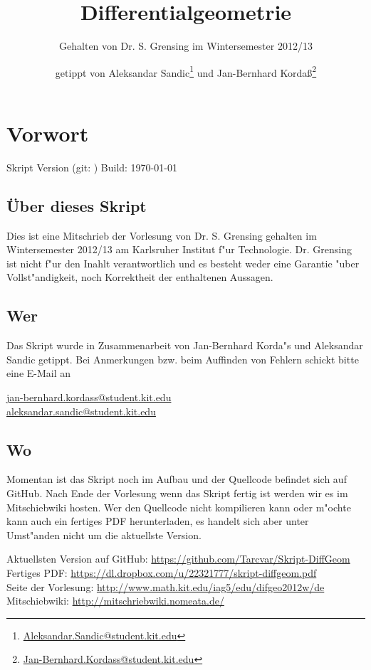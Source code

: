 \documentclass[paper=A4, twoside, chapterprefix=true, bibliography=totoc, headsepline]{scrbook}
\title{Differentialgeometrie}
\subtitle{Gehalten von Dr. S. Grensing im Wintersemester 2012/13}
\author{getippt von Aleksandar Sandic\thanks{\href{mailto:aleksandar.sandic@student.kit.edu}{Aleksandar.Sandic@student.kit.edu}} und Jan-Bernhard Korda\ss\thanks{\href{mailto:jan-bernhard.kordass@student.kit.edu}{Jan-Bernhard.Kordass@student.kit.edu}}}
\begin{document}
\maketitle

\setlength\parskip{0.6pt}
\tableofcontents

\chapter*{Vorwort}
\setlength\parskip{\smallskipamount} Skript Version \textbf{\GITVersionTag}
(git: \GITAbrHash) \quad Build: \today

\section*{\"Uber dieses Skript}
Dies ist eine Mitschrieb der Vorlesung  von Dr. S. Grensing gehalten im Wintersemester 2012/13 am Karlsruher Institut f"ur Technologie.
Dr. Grensing ist nicht f"ur den Inahlt verantwortlich und es besteht weder eine Garantie "uber Vollst"andigkeit, noch Korrektheit der enthaltenen Aussagen.

\section*{Wer}
Das Skript wurde in Zusammenarbeit von Jan-Bernhard Korda"s und Aleksandar Sandic getippt.
Bei Anmerkungen bzw. beim Auffinden von Fehlern schickt bitte eine E-Mail an
\begin{center}
  \href{mailto:jan-bernhard.kordass@student.kit.edu}{jan-bernhard.kordass@student.kit.edu}\\
  \href{mailto:aleksandar.sandic@student.kit.edu}{aleksandar.sandic@student.kit.edu}
\end{center}

\section*{Wo}
Momentan ist das Skript noch im Aufbau und der Quellcode befindet sich auf GitHub.
Nach Ende der Vorlesung wenn das Skript fertig ist werden wir es im Mitschiebwiki hosten.
Wer den Quellcode nicht kompilieren kann oder m"ochte kann auch ein fertiges PDF herunterladen, es handelt sich aber unter Umst"anden nicht um die aktuellste Version.

Aktuellsten Version auf GitHub: \url{https://github.com/Tarcvar/Skript-DiffGeom}\\
Fertiges PDF: \url{https://dl.dropbox.com/u/22321777/skript-diffgeom.pdf}\\
Seite der Vorlesung: \url{http://www.math.kit.edu/iag5/edu/difgeo2012w/de}\\
Mitschiebwiki: \url{http://mitschriebwiki.nomeata.de/}
\end{document}
